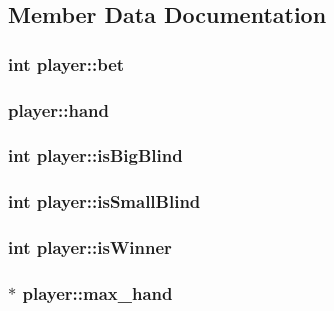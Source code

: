 \subsection{Member Data Documentation}
\hypertarget{structplayer_a0c5838d28a03958d82094cee91d73cd8}{
\subsubsection[{bet}]{\setlength{\rightskip}{0pt plus 5cm}int player\+::bet}}\label{structplayer_a0c5838d28a03958d82094cee91d73cd8}
\hypertarget{structplayer_ac8ad7a367cbc23ff4a83c28726cfe0eb}{
\subsubsection[{hand}]{ player\+::hand}}\label{structplayer_ac8ad7a367cbc23ff4a83c28726cfe0eb}
\hypertarget{structplayer_aa29010f77b5955ef3a0d9cc59b13699a}{
\subsubsection[{is\+Big\+Blind}]{\setlength{\rightskip}{0pt plus 5cm}int player\+::is\+Big\+Blind}}\label{structplayer_aa29010f77b5955ef3a0d9cc59b13699a}
\hypertarget{structplayer_a00d758277154f5f7990db0f2d849586a}{
\subsubsection[{is\+Small\+Blind}]{\setlength{\rightskip}{0pt plus 5cm}int player\+::is\+Small\+Blind}}\label{structplayer_a00d758277154f5f7990db0f2d849586a}
\hypertarget{structplayer_ae3ed3af8f14bfaec499bac6ce8b6767f}{
\subsubsection[{is\+Winner}]{\setlength{\rightskip}{0pt plus 5cm}int player\+::is\+Winner}}\label{structplayer_ae3ed3af8f14bfaec499bac6ce8b6767f}
\hypertarget{structplayer_a909dfff6c4158a7aa0a6fcc23f96d319}{
\subsubsection[{max\+\_\+hand}]{ $\ast$ player\+::max\+\_\+hand}}\label{structplayer_a909dfff6c4158a7aa0a6fcc23f96d319}
